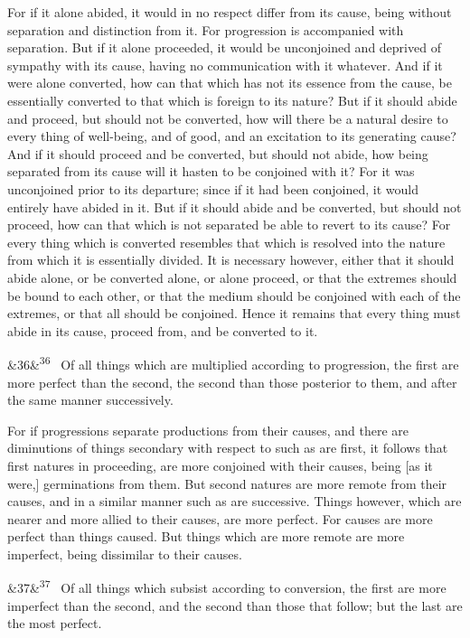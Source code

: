 \documentclass[12pt]{article}
\newcommand{\para}[1][]{\par\noindent\ifx&#1&\else\textsuperscript{\footnotesize #1}~\fi}
\begin{document}
For if it alone abided, it would in no respect differ from its cause, being without separation and distinction from it. For progression is accompanied with separation. But if it alone proceeded, it would be unconjoined and deprived of sympathy with its cause, having no communication with it whatever. And if it were alone converted, how can that which has not its essence from the cause, be essentially converted to that which is foreign to its nature? But if it should abide and proceed, but should not be converted, how will there be a natural desire to every thing of well-being, and of good, and an excitation to its generating cause? And if it should proceed and be converted, but should not abide, how being separated from its cause will it hasten to be conjoined with it? For it was unconjoined prior to its departure; since if it had been conjoined, it would entirely have abided in it. But if it should abide and be converted, but should not proceed, how can that which is not separated be able to revert to its cause? For every thing which is converted resembles that which is resolved into the nature from which it is essentially divided. It is necessary however, either that it should abide alone, or be converted alone, or alone proceed, or that the extremes should be bound to each other, or that the medium should be conjoined with each of the extremes, or that all should be conjoined. Hence it remains that every thing must abide in its cause, proceed from, and be converted to it.

\para[36] Of all things which are multiplied according to progression, the first are more perfect than the second, the second than those posterior to them, and after the same manner successively.

For if progressions separate productions from their causes, and there are diminutions of things secondary with respect to such as are first, it follows that first natures in proceeding, are more conjoined with their causes, being [as it were,] germinations from them. But second natures are more remote from their causes, and in a similar manner such as are successive. Things however, which are nearer and more allied to their causes, are more perfect. For causes are more perfect than things caused. But things which are more remote are more imperfect, being dissimilar to their causes.

\para[37] Of all things which subsist according to conversion, the first are more imperfect than the second, and the second than those that follow; but the last are the most perfect.
\end{document}
